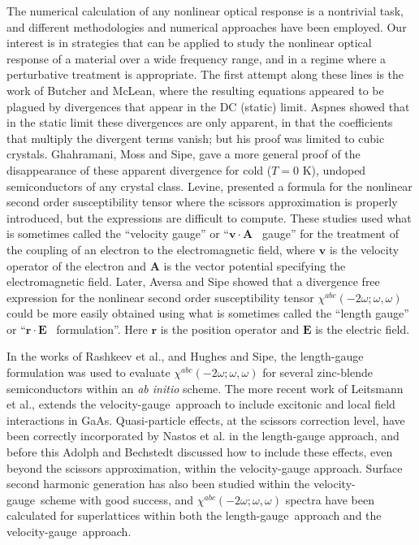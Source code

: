 \documentclass[floatfix,prb,aps,superscriptaddress,11pt]{revtex4}
\begin{document}
The numerical calculation of any nonlinear optical response is a nontrivial
task, and different methodologies and numerical approaches have been
employed.
Our interest is in strategies that can be applied to study the nonlinear optical 
response of a material over a wide frequency range, and in a regime where a 
perturbative treatment is appropriate. The first attempt along these lines is 
the work of Butcher and McLean,\cite{butcherPPS63} where the resulting equations
appeared to be plagued by divergences that appear in the DC (static) limit.
Aspnes\cite{aspnesPRB72} showed that in the static limit these divergences
are only apparent, in that the coefficients that multiply the
divergent terms vanish;
but his proof was limited to cubic crystals. Ghahramani,
Moss and Sipe,\cite{ghahramaniPRB91} gave a more general proof of the
disappearance of these apparent divergence for cold ($T=0$ K), undoped
semiconductors of any crystal class. 
Levine,\cite{levinePRB94} presented a formula for the  
nonlinear
second order susceptibility tensor
where the scissors approximation is properly introduced, but 
the expressions are difficult to compute.
These studies used what is sometimes
called the ``velocity gauge'' or ``$\mathbf{v}\cdot\mathbf{A}$~ gauge'' for the treatment of the
coupling of an electron to the electromagnetic field, where $\mathbf{v}$ is the
velocity operator of the electron and $\mathbf{A}$ is the vector potential
specifying the electromagnetic field. 
Later, Aversa and Sipe\cite{aversaPRB95} showed that a                                  
divergence free expression for the nonlinear second order                                           
susceptibility tensor
$\chi^{abc}(-2\omega;\omega,\omega)$
could be more easily obtained using what is                               
sometimes called the ``length gauge'' or ``$\mathbf{r}\cdot\mathbf{E}$~
formulation''. Here $\mathbf{r}$
 is the position operator and $\mathbf{E}$ is the electric field.

In the works of Rashkeev et al.,\cite{rashkeevPRB98} and Hughes and
Sipe,\cite{hughesPRB96} the length-gauge formulation
was used to evaluate $\chi^{abc}(-2\omega;\omega,\omega)$ for
several zinc-blende semiconductors
within an \textit{ab initio} scheme.
The more recent work of Leitsmann et al.,
\cite{leitsmannPRB05} extends the velocity-gauge~approach to include excitonic and
local field interactions in GaAs. Quasi-particle effects, at the scissors
correction level, have been correctly incorporated by Nastos et al.\cite
{nastosPRB05} in the length-gauge approach, and before this 
Adolph and Bechstedt\cite{adolphPRB98} discussed how to include these
effects, even beyond the
scissors approximation, within the velocity-gauge approach. Surface second harmonic
generation has also been studied within the velocity-gauge~scheme with good success,
\cite{mendozaPRB01,mendozaPRL98,reiningPRB94} and $\chi^{abc}(-2\omega;\omega,\omega)$ spectra have
been calculated for superlattices within both 
the length-gauge~approach\cite{sharmaPRB03} and the 
velocity-gauge~approach.\cite{ghahramaniPRB91}
\end{document}
